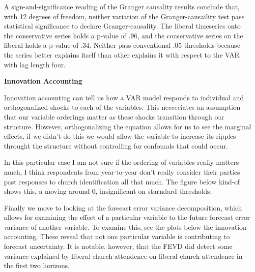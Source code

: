 \documentclass[12pt]{article}\usepackage[]{graphicx}\usepackage[]{color}
\begin{document}
\begin{flushleft}
A sign-and-significance reading of the Granger causality results conclude that, with 12 degrees of freedom, neither variation of the Granger-causaility test pass statistical significance to declare Granger-causality. The liberal timeseries onto the conservative series holds a p-value of .96, and the conservative series on the liberal holds a p-value of .34. Neither pass conventional .05 thresholds because the series better explains itself than other explains it with respect to the VAR with lag length four.


\textbf{Innovation Accounting} 


Innovation accounting can tell us how a VAR model responds to individual and orthogonalized shocks to each of the variables. This necceciates an assumption that our variable orderings matter as these shocks transition through our structure. However, orthogonalizing the equation allows for us to see the marginal effects, if we didn't do this we would allow the variable to increase its ripples throught the structure without controlling for confounds that could occur.

In this particular case I am not sure if the ordering of variables really matters much, I think respondents from  year-to-year don't really consider their parties past responses to church identification all that much. The figure below kind-of shows this, a moving around 0, insignificant on starndard thresholds.

Finally we move to looking at the forecast error variance decomposition, which allows for examining the effect of a particular variable to the future forecast error variance of another variable. To examine this, see the plots below the innovation accounting. These reveal that not one particular variable is contributing to forecast uncertainty. It is notable, however, that the FEVD did detect some variance explained by liberal church attendence on liberal church attendence in the first two horizons.



\end{flushleft}
\end{document}
